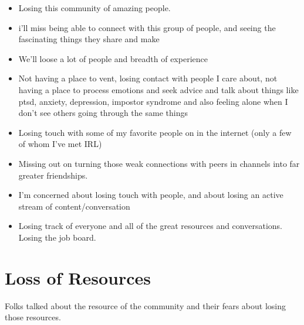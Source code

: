 \documentclass[
]{book}
\begin{document}
\begin{itemize}
\item
  Losing this community of amazing people.
\item
  i'll miss being able to connect with this group of people, and seeing the fascinating things they share and make
\item
  We'll loose a lot of people and breadth of experience
\item
  Not having a place to vent, losing contact with people I care about, not having a place to process emotions and seek advice and talk about things like ptsd, anxiety, depression, impostor syndrome and also feeling alone when I don't see others going through the same things
\item
  Losing touch with some of my favorite people on in the internet (only a few of whom I've met IRL)
\item
  Missing out on turning those weak connections with peers in channels into far greater friendships.
\item
  I'm concerned about losing touch with people, and about losing an active stream of content/conversation
\item
  Losing track of everyone and all of the great resources and conversations. Losing the job board.
\end{itemize}

\section{Loss of Resources}\label{loss-of-resources}

Folks talked about the resource of the community and their fears about losing those resources.
\end{document}
